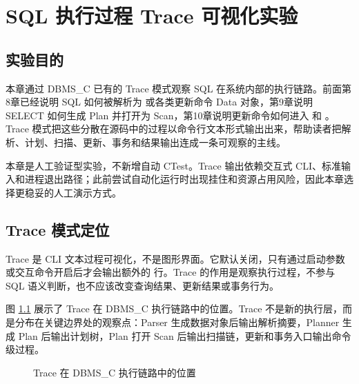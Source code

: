 \chapter{SQL 执行过程 Trace 可视化实验}
\label{chap:trace-visualization}

\section{实验目的}
\label{sec:trace-purpose}

本章通过 DBMS\_C 已有的 Trace 模式观察 SQL 在系统内部的执行链路。前面第8章已经说明 SQL 如何被解析为  或各类更新命令 Data 对象，第9章说明 SELECT 如何生成 Plan 并打开为 Scan，第10章说明更新命令如何进入  和 。Trace 模式把这些分散在源码中的过程以命令行文本形式输出出来，帮助读者把解析、计划、扫描、更新、事务和结果输出连成一条可观察的主线。

本章是人工验证型实验，不新增自动 CTest。Trace 输出依赖交互式 CLI、标准输入和进程退出路径；此前尝试自动化运行时出现挂住和资源占用风险，因此本章选择更稳妥的人工演示方式。

\section{Trace 模式定位}
\label{sec:trace-position}

Trace 是 CLI 文本过程可视化，不是图形界面。它默认关闭，只有通过启动参数或交互命令开启后才会输出额外的 \codepath{[TRACE_*]} 行。Trace 的作用是观察执行过程，不参与 SQL 语义判断，也不应该改变查询结果、更新结果或事务行为。

图 \ref{fig:trace-position} 展示了 Trace 在 DBMS\_C 执行链路中的位置。Trace 不是新的执行层，而是分布在关键边界处的观察点：Parser 生成数据对象后输出解析摘要，Planner 生成 Plan 后输出计划树，Plan 打开 Scan 后输出扫描链，更新和事务入口输出命令级过程。

\begin{figure}[htbp]
  \centering
  \caption{Trace 在 DBMS\_C 执行链路中的位置}
  \label{fig:trace-position}
\end{figure}

